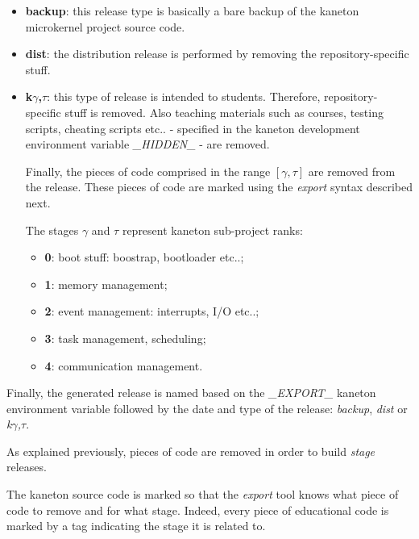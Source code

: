 \begin{itemize}
  \item
    \textbf{backup}: this release type is basically a bare backup of
    the kaneton microkernel project source code.
  \item
    \textbf{dist}: the distribution release is performed by removing
    the repository-specific stuff.
  \item
    \textbf{k}$\gamma$\textbf{,}$\tau$: this type of release is intended
    to students. Therefore, repository-specific stuff is removed. Also
    teaching materials such as courses, testing scripts, cheating scripts
    etc.. - specified in the kaneton development environment variable
    \textit{\_HIDDEN\_} - are removed.

    \-

    Finally, the pieces of code comprised in the range $[\gamma,\tau]$
    are removed from the release. These pieces of code are marked using the
    \textit{export} syntax described next.

    \-

    The stages $\gamma$ and $\tau$ represent kaneton sub-project ranks:

    \begin{itemize}
      \item
	\textbf{0}: boot stuff: boostrap, bootloader etc..;
      \item
	\textbf{1}: memory management;
      \item
	\textbf{2}: event management: interrupts, I/O etc..;
      \item
	\textbf{3}: task management, scheduling;
      \item
	\textbf{4}: communication management.
    \end{itemize}
\end{itemize}

Finally, the generated release is named based on the \textit{\_EXPORT\_}
kaneton environment variable followed by the date and type of the release:
\textit{backup}, \textit{dist} or \textit{k}$\gamma$\textit{,}$\tau$.



As explained previously, pieces of code are removed in order to build
\textit{stage} releases.

The kaneton source code is marked so that the \textit{export} tool knows
what piece of code to remove and for what stage. Indeed, every piece of
educational code is marked by a tag indicating the stage it is related to.


